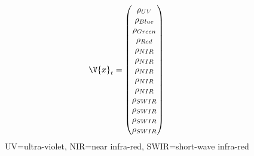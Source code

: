 \documentclass[%
  aspectratio=169,
  9pt,
  USenglish,
  titlegraphic, %
  affiliationintitlepagehead,
  affiliation,
]{beamer}
\begin{document}
\begin{frame}
\begin{columns}
	
	\begin{equation*}
	\V{x}_t = \begin{pmatrix}
	\rho_{UV} \\ 
	\rho_{Blue} \\
	\rho_{Green} \\
	\rho_{Red} \\
	\rho_{NIR} \\
	\rho_{NIR} \\
	\rho_{NIR} \\
	\rho_{NIR} \\
	\rho_{NIR} \\
	\rho_{SWIR} \\
	\rho_{SWIR} \\
	\rho_{SWIR} \\
	\rho_{SWIR}
	\end{pmatrix}
	\end{equation*}
	\small UV=ultra-violet, NIR=near infra-red, SWIR=short-wave infra-red
\end{columns}

\end{frame}
\end{document}

